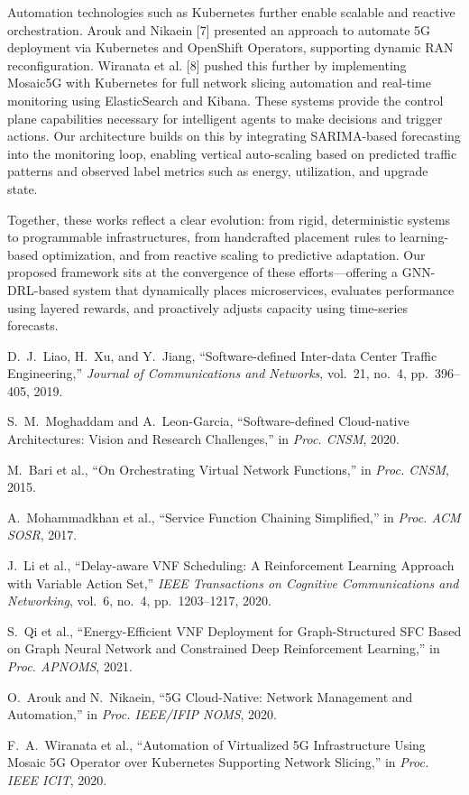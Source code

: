 \documentclass[conference]{IEEEtran}
\begin{document}
Automation technologies such as Kubernetes further enable scalable and reactive orchestration. Arouk and Nikaein [7] presented an approach to automate 5G deployment via Kubernetes and OpenShift Operators, supporting dynamic RAN reconfiguration. Wiranata et al. [8] pushed this further by implementing Mosaic5G with Kubernetes for full network slicing automation and real-time monitoring using ElasticSearch and Kibana. These systems provide the control plane capabilities necessary for intelligent agents to make decisions and trigger actions. Our architecture builds on this by integrating SARIMA-based forecasting into the monitoring loop, enabling vertical auto-scaling based on predicted traffic patterns and observed label metrics such as energy, utilization, and upgrade state.

Together, these works reflect a clear evolution: from rigid, deterministic systems to programmable infrastructures, from handcrafted placement rules to learning-based optimization, and from reactive scaling to predictive adaptation. Our proposed framework sits at the convergence of these efforts—offering a GNN-DRL-based system that dynamically places microservices, evaluates performance using layered rewards, and proactively adjusts capacity using time-series forecasts.

\begin{thebibliography}{99}

D.~J.~Liao, H.~Xu, and Y.~Jiang, ``Software-defined Inter-data Center Traffic Engineering,'' \textit{Journal of Communications and Networks}, vol.~21, no.~4, pp.~396--405, 2019.

S.~M.~Moghaddam and A.~Leon-Garcia, ``Software-defined Cloud-native Architectures: Vision and Research Challenges,'' in \textit{Proc. CNSM}, 2020.

M.~Bari et al., ``On Orchestrating Virtual Network Functions,'' in \textit{Proc. CNSM}, 2015.

A.~Mohammadkhan et al., ``Service Function Chaining Simplified,'' in \textit{Proc. ACM SOSR}, 2017.

J.~Li et al., ``Delay-aware VNF Scheduling: A Reinforcement Learning Approach with Variable Action Set,'' \textit{IEEE Transactions on Cognitive Communications and Networking}, vol.~6, no.~4, pp.~1203--1217, 2020.

S.~Qi et al., ``Energy-Efficient VNF Deployment for Graph-Structured SFC Based on Graph Neural Network and Constrained Deep Reinforcement Learning,'' in \textit{Proc. APNOMS}, 2021.

O.~Arouk and N.~Nikaein, ``5G Cloud-Native: Network Management and Automation,'' in \textit{Proc. IEEE/IFIP NOMS}, 2020.

F.~A.~Wiranata et al., ``Automation of Virtualized 5G Infrastructure Using Mosaic 5G Operator over Kubernetes Supporting Network Slicing,'' in \textit{Proc. IEEE ICIT}, 2020.

\end{thebibliography}
\end{document}
